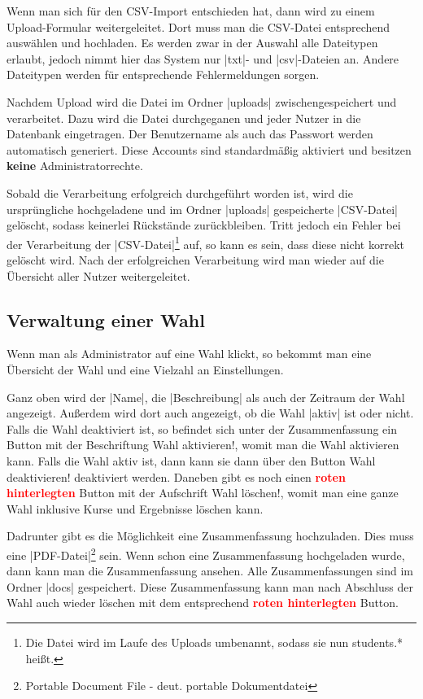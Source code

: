 \documentclass[ngerman]{ltxdoc}
\begin{document}
Wenn man sich für den CSV-Import entschieden hat, dann wird zu einem Upload-Formular
weitergeleitet. Dort muss man die CSV-Datei entsprechend auswählen und hochladen.
Es werden zwar in der Auswahl alle Dateitypen erlaubt, jedoch nimmt hier das
System nur |txt|- und |csv|-Dateien an. Andere Dateitypen werden für entsprechende
Fehlermeldungen sorgen.

Nachdem Upload wird die Datei im Ordner |uploads| zwischengespeichert und verarbeitet.
Dazu wird die Datei durchgeganen und jeder Nutzer in die Datenbank eingetragen.
Der Benutzername als auch das Passwort werden automatisch generiert. Diese
Accounts sind standardmäßig aktiviert und besitzen \textbf{keine} Administratorrechte.

Sobald die Verarbeitung erfolgreich durchgeführt worden ist, wird die ursprüngliche
hochgeladene und im Ordner |uploads| gespeicherte |CSV-Datei| gelöscht, sodass
keinerlei Rückstände zurückbleiben. Tritt jedoch ein Fehler bei der Verarbeitung
der |CSV-Datei|\footnote{Die Datei wird im Laufe des Uploads umbenannt, sodass sie nun \glqq students.*\grqq{} heißt.}
auf, so kann es sein, dass diese nicht korrekt gelöscht wird. Nach der erfolgreichen
Verarbeitung wird man wieder auf die Übersicht aller Nutzer weitergeleitet.

\subsection{Verwaltung einer Wahl}

Wenn man als Administrator auf eine Wahl klickt, so bekommt man eine Übersicht
der Wahl und eine Vielzahl an Einstellungen.

Ganz oben wird der |Name|, die |Beschreibung| als auch der Zeitraum der Wahl angezeigt.
Außerdem wird dort auch angezeigt, ob die Wahl |aktiv| ist oder nicht. Falls die
Wahl deaktiviert ist, so befindet sich unter der Zusammenfassung ein Button mit der
Beschriftung \glqq Wahl aktivieren!\grqq{}, womit man die Wahl aktivieren kann. Falls
die Wahl aktiv ist, dann kann sie dann über den Button \glqq Wahl deaktivieren!\grqq
deaktiviert werden. Daneben gibt es noch einen \textcolor{red}{\textbf{roten hinterlegten}}
Button mit der Aufschrift \glqq Wahl löschen!\grqq{}, womit man eine ganze Wahl inklusive
Kurse und Ergebnisse löschen kann.

Dadrunter gibt es die Möglichkeit eine Zusammenfassung hochzuladen. Dies muss eine
|PDF-Datei|\footnote{Portable Document File - deut. portable Dokumentdatei} sein.
Wenn schon eine Zusammenfassung hochgeladen wurde, dann kann man die Zusammenfassung
ansehen. Alle Zusammenfassungen sind im Ordner |docs| gespeichert. Diese Zusammenfassung
kann man nach Abschluss der Wahl auch wieder löschen mit dem entsprechend \textcolor{red}{\textbf{roten hinterlegten}}
Button.
\end{document}

